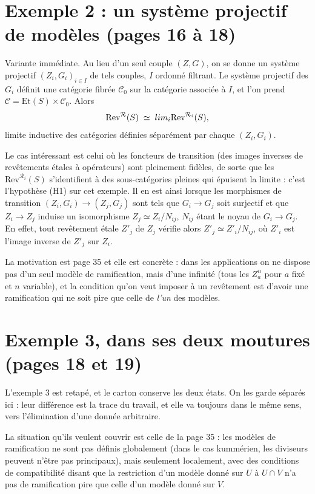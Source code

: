 \documentclass[11pt,a4paper]{article}
\begin{document}
\section*{Exemple 2 : un système projectif de modèles (pages 16 à 18)}

Variante immédiate. Au lieu d'un seul couple $(Z, G)$, on se donne un système
projectif $(Z_{i}, G_{i})_{i \in I}$ de tels couples, $I$ ordonné filtrant. Le
système projectif des $G_{i}$ définit une catégorie fibrée $\mathcal{C}_{0}$
sur la catégorie associée à $I$, et l'on prend
$\mathcal{C} = \mathrm{Et}(S) \times \mathcal{C}_{0}$. Alors
\[
  \mathrm{Rev}^{\mathcal{R}}(S) \;\simeq\;
  \varinjlim_{i} \mathrm{Rev}^{\mathcal{R}_{i}}(S) ,
\]
limite inductive des catégories définies séparément par chaque $(Z_{i},G_{i})$.

Le cas intéressant est celui où les foncteurs de transition (des
images inverses de revêtements étales à opérateurs) sont pleinement fidèles,
de sorte que les $\mathrm{Rev}^{\mathcal{R}_{i}}(S)$ s'identifient à des
sous-catégories pleines qui épuisent la limite : c'est l'hypothèse (H1) sur cet
exemple. Il en est ainsi lorsque les morphismes de transition
$(Z_{i}, G_{i}) \to (Z_{j}, G_{j})$ sont tels que $G_{i} \to G_{j}$ soit
surjectif et que $Z_{i} \to Z_{j}$ induise un isomorphisme
$Z_{j} \simeq Z_{i}/N_{ij}$, $N_{ij}$ étant le noyau de $G_{i} \to G_{j}$. En
effet, tout revêtement étale $Z'_{j}$ de $Z_{j}$ vérifie alors
$Z'_{j} \simeq Z'_{i}/N_{ij}$, où $Z'_{i}$ est l'image inverse de $Z'_{j}$
sur $Z_{i}$.

La motivation est page 35 et elle est concrète : dans les applications on ne
dispose pas d'un seul modèle de ramification, mais d'une infinité (tous les
$Z^{n}_{a}$ pour $a$ fixé et $n$ variable), et la condition qu'on veut
imposer à un revêtement est d'avoir une ramification qui ne soit pire que celle
de \emph{l'un} des modèles.

\section*{Exemple 3, dans ses deux moutures (pages 18 et 19)}

L'exemple 3 est retapé, et le carton conserve les deux états. On les garde
séparés ici : leur différence est la trace du travail, et elle va toujours
dans le même sens, vers l'élimination d'une donnée arbitraire.

La situation qu'ils veulent couvrir est celle de la page 35 : les modèles de
ramification ne sont pas définis globalement (dans le cas kummérien, les
diviseurs peuvent n'être pas principaux), mais seulement localement, avec des
conditions de compatibilité disant que la restriction d'un modèle donné sur $U$
à $U \cap V$ n'a pas de ramification pire que celle d'un modèle donné sur $V$.
\end{document}
